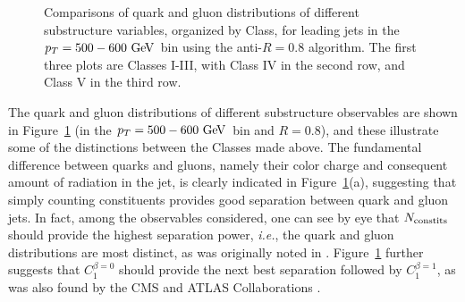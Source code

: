 \begin{figure}
\caption{Comparisons of quark and gluon distributions of different substructure variables, organized by Class, for leading jets in the 
$\pt=500-600 \GeV$ bin using the anti-\kT $R=0.8$ algorithm. The first three plots are Classes I-III, with Class IV in the second row, and Class V in the third row.}
\label{fig:qg_pt500_subst_AKt_R08}
\end{figure}

The quark and gluon distributions of different substructure observables
are shown in Figure~\ref{fig:qg_pt500_subst_AKt_R08} (in the $\pt=500-600\GeV$ bin and $R=0.8$), and these illustrate some of the distinctions between the Classes made above. 
The fundamental difference between quarks and gluons, namely their color charge and consequent amount of radiation in the jet, is clearly indicated in Figure~\ref{fig:qg_pt500_subst_AKt_R08}(a), 
suggesting that simply counting constituents  provides good separation between quark and gluon jets.  In fact, among the observables
considered, one can see by eye that $N_{\rm constits}$ should provide the highest separation
power, \textit{i.e.}, the quark and gluon distributions are most distinct, as was originally noted in \cite{Gallicchio:2011xq,Gallicchio:2012ez}. 
Figure~\ref{fig:qg_pt500_subst_AKt_R08} further suggests
that $C_1^{\beta=0}$ should provide the next best separation followed by $C_1^{\beta=1}$, as was also
found by the CMS and ATLAS Collaborations \cite{CMS:2013kfa,Aad:2014gea}.   

